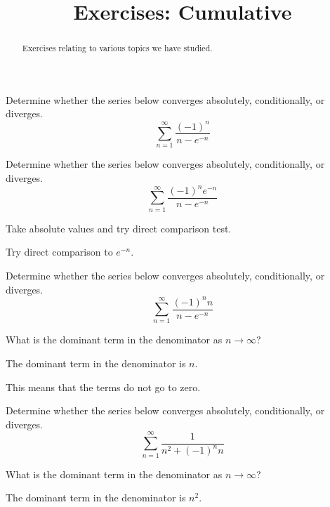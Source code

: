 \documentclass{ximera}
\title{Exercises: Cumulative}
\begin{document}
\begin{abstract}
Exercises relating to various topics we have studied.
\end{abstract}
\maketitle

\begin{exercise}
Determine whether the series below converges absolutely, conditionally, or diverges.
\[ \sum_{n=1}^\infty \frac{(-1)^n}{n - e^{-n}} \]
\begin{multipleChoice}
\end{multipleChoice}
\end{exercise}

\begin{exercise}
Determine whether the series below converges absolutely, conditionally, or diverges.
\[ \sum_{n=1}^\infty \frac{(-1)^n e^{-n}}{n - e^{-n}} \]
\begin{multipleChoice}
\end{multipleChoice}
\begin{hint}
Take absolute values and try direct comparison test.
\end{hint}
\begin{hint}
Try direct comparison to $e^{-n}$.
\end{hint}
\end{exercise}

\begin{exercise}
Determine whether the series below converges absolutely, conditionally, or diverges.
\[ \sum_{n=1}^\infty \frac{(-1)^n n}{n - e^{-n}} \]
\begin{multipleChoice}
\end{multipleChoice}
\begin{hint}
What is the dominant term in the denominator as $n \rightarrow \infty$?
\end{hint}
\begin{hint}
The dominant term in the denominator is $n$.
\end{hint}
\begin{hint}
This means that the terms do not go to zero.
\end{hint}
\end{exercise}

\begin{exercise}
Determine whether the series below converges absolutely, conditionally, or diverges.
\[ \sum_{n=1}^\infty \frac{1}{n^2 + (-1)^n n} \]
\begin{multipleChoice}
\end{multipleChoice}
\begin{hint}
What is the dominant term in the denominator as $n \rightarrow \infty$?
\end{hint}
\begin{hint}
The dominant term in the denominator is $n^2$.
\end{hint}
\end{exercise}
\end{document}
